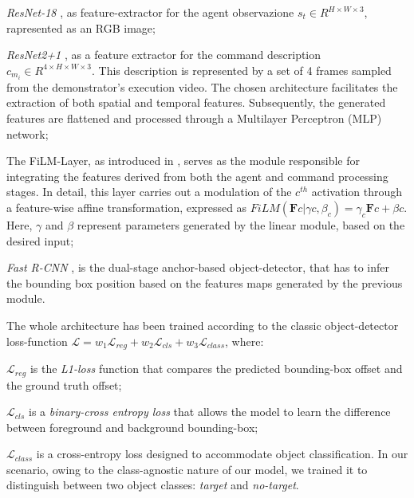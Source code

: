 \begin{itemize*}[label=$(\bullet)$]
    \item \textit{ResNet-18} \cite{resnet}, as feature-extractor for the agent observazione $s_{t} \in R^{H \times W \times 3}$, rapresented as an RGB image;
    \item \textit{ResNet2+1} \cite{resnet21},  as a feature extractor for the command description $c_{m_{i}} \in R^{4 \times H \times W \times 3}$. This description is represented by a set of 4 frames sampled from the demonstrator's execution video. The chosen architecture facilitates the extraction of both spatial and temporal features. Subsequently, the generated features are flattened and processed through a Multilayer Perceptron (MLP) network;
    \item The FiLM-Layer, as introduced in \cite{perez2018film}, serves as the module responsible for integrating the features derived from both the agent and command processing stages. In detail, this layer carries out a modulation of the $c^{th}$ activation through a feature-wise affine transformation, expressed as $FiLM(\textbf{F}{c}|\gamma{c}, \beta_{c}) = \gamma_{c} \textbf{F}{c} + \beta{c}$. Here, $\gamma$ and $\beta$ represent parameters generated by the linear module, based on the desired input;
    \item \textit{Fast R-CNN} \cite{fastrcnn}, is the dual-stage anchor-based object-detector, that has to infer the bounding box position based on the features maps generated by the previous module.
\end{itemize*}
The whole architecture has been trained according to the classic object-detector loss-function $\mathcal{L} = w_{1}\mathcal{L}_{reg} + w_{2}\mathcal{L}_{cls} + w_{3}\mathcal{L}_{class}$, where: \begin{itemize*}[label=$(\bullet)$]
    \item $\mathcal{L}_{reg}$ is the \textit{L1-loss} function that compares the predicted bounding-box offset and the ground truth offset;
    \item $\mathcal{L}_{cls}$ is a \textit{binary-cross entropy loss} that allows the model to learn the difference between foreground and background bounding-box;
    \item $\mathcal{L}_{class}$ is a cross-entropy loss designed to accommodate object classification. In our scenario, owing to the class-agnostic nature of our model, we trained it to distinguish between two object classes: \textit{target} and \textit{no-target}.
\end{itemize*}


